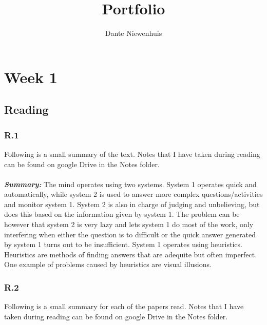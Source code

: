 \documentclass[]{article}
\title{Portfolio}
\author{Dante Niewenhuis}
\begin{document}
\maketitle

\section*{Week 1}

\subsection*{Reading} 

\subsubsection*{R.1} 
Following is a small summary of the text. Notes that I have taken during reading 
can be found on google Drive in the Notes folder.\\\\
\textbf{\textit{Summary:}} The mind operates using two systems. 
System 1 operates quick and automatically, while system 2 is used to answer 
more complex questions/activities and monitor system 1. System 2 is also in
charge of judging and unbelieving, but does this based on the information 
given by system 1. 
The problem can be however that system 2 is very lazy and lets system 1 do most of the work, only interfering 
when either the question is to difficult or the quick answer generated by 
system 1 turns out to be insufficient. System 1 operates using heuristics. 
Heuristics are methods of finding answers that are adequite but often imperfect.
One example of problems caused by heuristics are visual illusions.  

\subsubsection*{R.2}
Following is a small summary for each of the papers read. 
Notes that I have taken during reading can be found on google Drive in the Notes folder.
\end{document}
